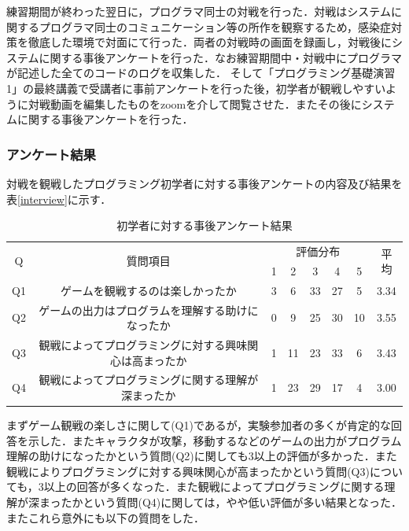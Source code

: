 練習期間が終わった翌日に，プログラマ同士の対戦を行った．対戦はシステムに関するプログラマ同士のコミュニケーション等の所作を観察するため，感染症対策を徹底した環境で対面にて行った．両者の対戦時の画面を録画し，対戦後にシステムに関する事後アンケートを行った．なお練習期間中・対戦中にプログラマが記述した全てのコードのログを収集した．
そして「プログラミング基礎演習1」の最終講義で受講者に事前アンケートを行った後，初学者が観戦しやすいように対戦動画を編集したものをzoomを介して閲覧させた．またその後にシステムに関する事後アンケートを行った．

\subsubsection{アンケート結果}

対戦を観戦したプログラミング初学者に対する事後アンケートの内容及び結果を表\ref{interview}に示す．

\begin{table}[h]
  \begin{center}
    \caption{初学者に対する事後アンケート結果}
    \label{beginner_interview}
      \begin{tabular}{|c|c|c|c|c|c|c|c|} \hline
        \multirow{2}{*}{Q} & \multirow{2}{*}{質問項目} & \multicolumn{5}{c}{評価分布} & \multirow{2}{*}{平均} \\
        & & 1 & 2 & 3 & 4 & 5 & \\ \hline\hline
        Q1 & ゲームを観戦するのは楽しかったか & 3 & 6 & 33 & 27 & 5 & 3.34\\ \hline
        Q2 & ゲームの出力はプログラムを理解する助けになったか & 0 & 9 & 25 & 30 & 10 & 3.55\\ \hline
        Q3 & 観戦によってプログラミングに対する興味関心は高まったか & 1 & 11 & 23 & 33 & 6 & 3.43\\ \hline
        Q4 & 観戦によってプログラミングに関する理解が深まったか & 1 & 23 & 29 & 17 & 4 & 3.00\\ \hline
      \end{tabular}
  \end{center}
\end{table}

まずゲーム観戦の楽しさに関して(Q1)であるが，実験参加者の多くが肯定的な回答を示した．またキャラクタが攻撃，移動するなどのゲームの出力がプログラム理解の助けになったかという質問(Q2)に関しても3以上の評価が多かった．また観戦によりプログラミングに対する興味関心が高まったかという質問(Q3)についても，3以上の回答が多くなった．また観戦によってプログラミングに関する理解が深まったかという質問(Q4)に関しては，やや低い評価が多い結果となった．またこれら意外にも以下の質問をした．

